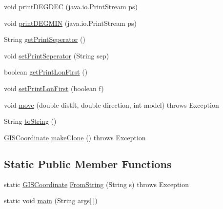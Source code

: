 \begin{DoxyCompactItemize}
\item 
void \hyperlink{classpt_1_1lsts_1_1asa_1_1pos_1_1GISCoordinate_ae97bb24d783abe10e6bc790961d6eb82}{print\+D\+E\+G\+D\+E\+C} (java.\+io.\+Print\+Stream ps)
\item 
void \hyperlink{classpt_1_1lsts_1_1asa_1_1pos_1_1GISCoordinate_a8aec11d7a098ac4e40de8ee0842d7e8f}{print\+D\+E\+G\+M\+I\+N} (java.\+io.\+Print\+Stream ps)
\item 
String \hyperlink{classpt_1_1lsts_1_1asa_1_1pos_1_1GISCoordinate_a6a70be20ef54de5a9208508e55acb48d}{get\+Print\+Seperator} ()
\item 
void \hyperlink{classpt_1_1lsts_1_1asa_1_1pos_1_1GISCoordinate_a3332b0c7f7ef5c7f66dc06dc90b2e0c3}{set\+Print\+Seperator} (String sep)
\item 
boolean \hyperlink{classpt_1_1lsts_1_1asa_1_1pos_1_1GISCoordinate_a259f3d63b647045112353814ae4ccb4b}{get\+Print\+Lon\+First} ()
\item 
void \hyperlink{classpt_1_1lsts_1_1asa_1_1pos_1_1GISCoordinate_ad6cc4e356f4cd3fe60cf1dd5f021609b}{set\+Print\+Lon\+First} (boolean f)
\item 
void \hyperlink{classpt_1_1lsts_1_1asa_1_1pos_1_1GISCoordinate_a704914e4d44bb89c34ff9b793fbd9cdd}{move} (double distft, double direction, int model)  throws Exception 
\item 
String \hyperlink{classpt_1_1lsts_1_1asa_1_1pos_1_1GISCoordinate_a03225aba7140447dba19bbd7af1cb08c}{to\+String} ()
\item 
\hyperlink{classpt_1_1lsts_1_1asa_1_1pos_1_1GISCoordinate}{G\+I\+S\+Coordinate} \hyperlink{classpt_1_1lsts_1_1asa_1_1pos_1_1GISCoordinate_ad0731d6c50e88d56aeba69a6d77b476d}{make\+Clone} ()  throws Exception 
\end{DoxyCompactItemize}
\subsection*{Static Public Member Functions}
\begin{DoxyCompactItemize}
\item 
static \hyperlink{classpt_1_1lsts_1_1asa_1_1pos_1_1GISCoordinate}{G\+I\+S\+Coordinate} \hyperlink{classpt_1_1lsts_1_1asa_1_1pos_1_1GISCoordinate_a855a9500556a5216c8ac07d91168bcb3}{From\+String} (String s)  throws Exception 
\item 
static void \hyperlink{classpt_1_1lsts_1_1asa_1_1pos_1_1GISCoordinate_a1503917523c6e5ed3c13207592c073c5}{main} (String args\mbox{[}$\,$\mbox{]})
\end{DoxyCompactItemize}
